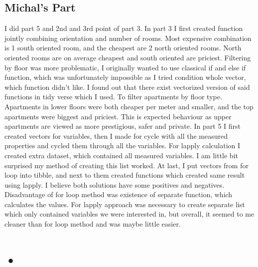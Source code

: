 \documentclass{article}
\begin{document}
\subsection*{Michal's  Part}
I did part 5 and 2nd and 3rd point of part 3. 
In part 3 I first created function jointly combining orientation and number of rooms. Most expensive combination is 1 south oriented room, and the cheapest are 2 north oriented rooms. North oriented rooms are on average cheapest and south oriented are priciest. Filtering by floor was more problematic, I originally wanted to use classical if and else if function, which was unfortunately impossible as I tried condition whole vector, which function didn’t like. I found out that there exist vectorized version of said functions in tidy verse which I used. To filter apartments by floor type. Apartments in lower floors were both cheaper per meter and smaller, and the top apartments were biggest and priciest. This is expected behaviour as upper apartments are viewed as more prestigious, safer and private. 
In part 5 I first created vectors for variables, then I made for cycle with all the measured properties and cycled them through all the variables. For lapply calculation I created extra dataset, which contained all measured variables. I am little bit surprised my method of creating this list worked. At last, I put vectors from for loop into tibble, and next to them created functions which created same result using lapply. I believe both solutions have some positives and negatives. Disadvantage of for loop method was existence of separate function, which calculates the values. For lapply approach was necessary to create separate list which only contained variables we were interested in, but overall, it seemed to me cleaner than for loop method and was maybe little easier.



\section*{•}
\end{document}
